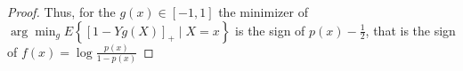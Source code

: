 \begin{proof}
	Thus, for the \(g(x)\in\left[-1,1\right]\) the minimizer of \(\arg\min_{g} E\left\{\left[1-Yg(X)\right]_{+}\mid X=x\right\}\) is the sign of \(p(x)-\frac{1}{2}\), that is the sign of \(f(x)=\log\frac{p(x)}{1-p(x)}\)
\end{proof}
